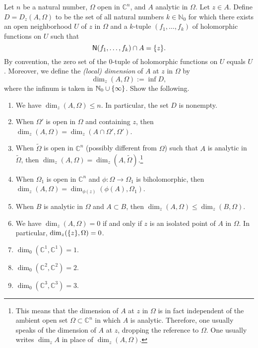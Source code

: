\documentclass[a4paper]{amsart}
\newcommand{\N}{\mathbb{N}}
\newcommand{\C}{\mathbb{C}}
\newcommand{\Zero}[1]{\mathsf{N}(#1)}
\theoremstyle{remark}
\numberwithin{equation}{question}
\DeclarePairedDelimiter\set{\{}{\}}
\begin{document}
\begin{question}[subtitle=On the local dimension of an analytic set]
\label{qu:local dim}
Let $n$ be a natural number, $\Omega$ open in $\C^n$, and $A$ analytic in $\Omega$. Let $z \in A$. Define $D = D_z(A,\Omega)$ to be the set of all natural numbers $k \in \N_0$ for which there exists an open neighborhood $U$ of $z$ in $\Omega$ and a $k$-tuple $(f_1,\dots,f_k)$ of holomorphic functions on $U$ such that
\begin{equation}
\label{eq:local dim}
\Zero{f_1,\dots,f_k} \cap A = \set z.
\end{equation}
By convention, the zero set of the $0$-tuple of holomorphic functions on $U$ equals $U$.
Moreover, we define the \emph{(local) dimension} of $A$ at $z$ in $\Omega$ by
\[
\dim_z(A,\Omega) := \inf D,
\]
where the infinum is taken in $\N_0 \cup \set\infty$. Show the following.
\begin{enumerate}
\item \label{it:local dim-a} We have $\dim_z(A,\Omega) \le n$. In particular, the set $D$ is nonempty.
\item \label{it:local dim-b} When $\Omega'$ is open in $\Omega$ and containing $z$, then $\dim_z(A,\Omega) = \dim_z(A \cap \Omega',\Omega')$.
\item When $\tilde\Omega$ is open in $\C^n$ (possibly different from $\Omega$) such that $A$ is analytic in $\tilde\Omega$, then $\dim_z(A,\Omega) = \dim_z(A,\tilde\Omega)$.\footnote{This means that the dimension of $A$ at $z$ in $\Omega$ is in fact independent of the ambient open set $\Omega \subset \C^n$ in which $A$ is analytic. Therefore, one usually speaks of the dimension of $A$ at $z$, dropping the reference to $\Omega$. One usually writes $\dim_zA$ in place of $\dim_z(A,\Omega)$.}
\item When $\Omega_1$ is open in $\C^n$ and $\phi \colon \Omega \to \Omega_1$ is biholomorphic, then $\dim_z(A,\Omega) = \dim_{\phi(z)}(\phi(A),\Omega_1)$.
\item When $B$ is analytic in $\Omega$ and $A \subset B$, then $\dim_z(A,\Omega) \le \dim_z(B,\Omega)$.
\item \label{it:local dim-f} We have $\dim_z(A,\Omega) = 0$ if and only if $z$ is an isolated point of $A$ in $\Omega$. In particular, $\dim_z(\set z,\Omega) = 0$.
\item \label{it:local dim-g} $\dim_0(\C^1,\C^1) = 1$.
\item \label{it:local dim-h} $\dim_0(\C^2,\C^2) = 2$.
\item \label{it:local dim-i} $\dim_0(\C^3,\C^3) = 3$.

\end{enumerate}
\end{question}
\end{document}
